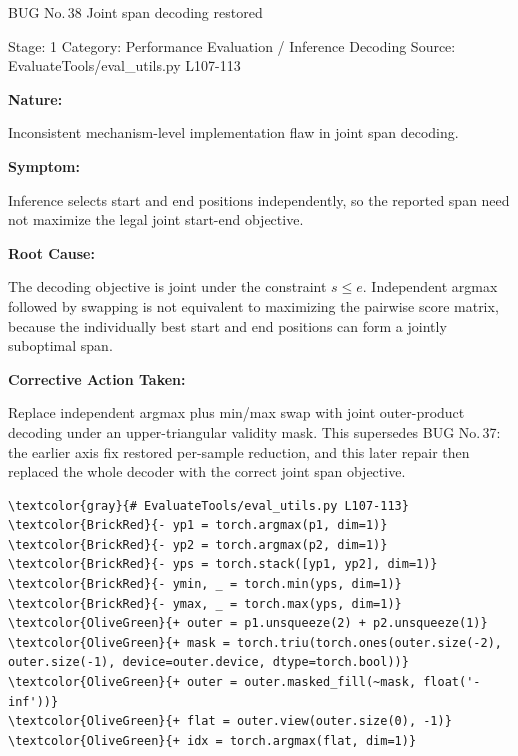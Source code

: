 \documentclass[10pt]{article}
\newcommand{\FieldLabel}[1]{%
 {\bfseries #1:}\par
}
\begin{document}
\begin{bugbox}{BUG No.\,38 \quad Joint span decoding restored}
{\color{MetaGray}\small Stage: 1 \;\textbar\; Category: Performance Evaluation / Inference Decoding \;\textbar\; Source: EvaluateTools/eval\_utils.py L107-113\par}
\vspace{0.22em}
\FieldLabel{Nature}
Inconsistent mechanism-level implementation flaw in joint span decoding.
\par
\vspace{0.35em}
\FieldLabel{Symptom}
Inference selects start and end positions independently, so the reported span need not maximize the legal joint start-end objective.
\par
\vspace{0.35em}
\FieldLabel{Root Cause}
The decoding objective is joint under the constraint $s \le e$. Independent argmax followed by swapping is not equivalent to maximizing the pairwise score matrix, because the individually best start and end positions can form a jointly suboptimal span.
\par
\vspace{0.35em}
\FieldLabel{Corrective Action Taken}
Replace independent argmax plus min/max swap with joint outer-product decoding under an upper-triangular validity mask. This supersedes BUG No.\,37: the earlier axis fix restored per-sample reduction, and this later repair then replaced the whole decoder with the correct joint span objective.
\par
\vspace{0.35em}
\begin{Verbatim}[commandchars=\\\{\},fontsize=\footnotesize,breaklines=true,breaksymbol={},frame=leftline,framerule=2pt,rulecolor=\color{gray!40},xleftmargin=6pt,formatcom=\singlespacing]
\textcolor{gray}{# EvaluateTools/eval_utils.py L107-113}
\textcolor{BrickRed}{- yp1 = torch.argmax(p1, dim=1)}
\textcolor{BrickRed}{- yp2 = torch.argmax(p2, dim=1)}
\textcolor{BrickRed}{- yps = torch.stack([yp1, yp2], dim=1)}
\textcolor{BrickRed}{- ymin, _ = torch.min(yps, dim=1)}
\textcolor{BrickRed}{- ymax, _ = torch.max(yps, dim=1)}
\textcolor{OliveGreen}{+ outer = p1.unsqueeze(2) + p2.unsqueeze(1)}
\textcolor{OliveGreen}{+ mask = torch.triu(torch.ones(outer.size(-2), outer.size(-1), device=outer.device, dtype=torch.bool))}
\textcolor{OliveGreen}{+ outer = outer.masked_fill(~mask, float('-inf'))}
\textcolor{OliveGreen}{+ flat = outer.view(outer.size(0), -1)}
\textcolor{OliveGreen}{+ idx = torch.argmax(flat, dim=1)}

\end{Verbatim}
\end{bugbox}
\end{document}

